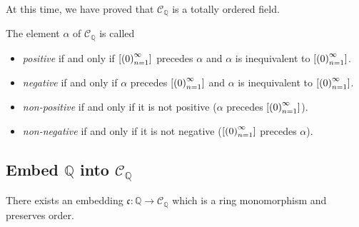 At this time, we have proved that $\mathscr{C}_{\mathbb{Q}}$ is a totally ordered field.

\begin{definition}
    The element $\alpha$ of $\mathscr{C}_{\mathbb{Q}}$ is called
    \begin{itemize}
        \item \textit{positive} if and only if $\left[{{\left({0}\right)}^{\infty}_{n=1}}\right]$ precedes $\alpha$ and $\alpha$ is inequivalent to $\left[{{\left({0}\right)}^{\infty}_{n=1}}\right]$.
        \item \textit{negative} if and only if $\alpha$ precedes $\left[{{\left({0}\right)}^{\infty}_{n=1}}\right]$ and $\alpha$ is inequivalent to $\left[{{\left({0}\right)}^{\infty}_{n=1}}\right]$.
        \item \textit{non-positive} if and only if it is not positive ($\alpha$ precedes $\left[{{\left({0}\right)}^{\infty}_{n=1}}\right]$).
        \item \textit{non-negative} if and only if it is not negative ($\left[{{\left({0}\right)}^{\infty}_{n=1}}\right]$ precedes $\alpha$).
    \end{itemize}
\end{definition}

\subsection{Embed $\mathbb{Q}$ into $\mathscr{C}_{\mathbb{Q}}$}

\begin{theorem}
    There exists an embedding $\mathfrak{c}: \mathbb{Q}\to\mathscr{C}_{\mathbb{Q}}$ which is a ring monomorphism and preserves order.
\end{theorem}

